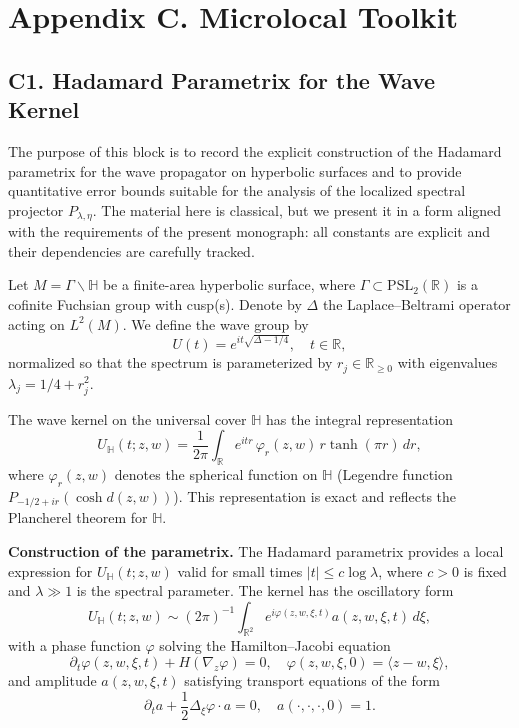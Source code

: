 \section*{Appendix C. Microlocal Toolkit}

\subsection*{C1. Hadamard Parametrix for the Wave Kernel}

The purpose of this block is to record the explicit construction of the Hadamard parametrix for the wave propagator on hyperbolic surfaces and to provide quantitative error bounds suitable for the analysis of the localized spectral projector $P_{\lambda,\eta}$. The material here is classical, but we present it in a form aligned with the requirements of the present monograph: all constants are explicit and their dependencies are carefully tracked.

\medskip

Let $M = \Gamma \backslash \mathbb{H}$ be a finite-area hyperbolic surface, where $\Gamma \subset \mathrm{PSL}_2(\mathbb{R})$ is a cofinite Fuchsian group with cusp(s). Denote by $\Delta$ the Laplace–Beltrami operator acting on $L^2(M)$. We define the wave group by
\[
U(t) = e^{it\sqrt{\Delta - 1/4}}, \quad t \in \mathbb{R},
\]
normalized so that the spectrum is parameterized by $r_j \in \mathbb{R}_{\ge 0}$ with eigenvalues $\lambda_j = 1/4 + r_j^2$.

The wave kernel on the universal cover $\mathbb{H}$ has the integral representation
\[
U_{\mathbb{H}}(t; z, w) = \frac{1}{2\pi} \int_{\mathbb{R}} e^{i t r} \, \varphi_r(z, w) \, r \tanh(\pi r)\, dr,
\]
where $\varphi_r(z, w)$ denotes the spherical function on $\mathbb{H}$ (Legendre function $P_{-1/2+ir}(\cosh d(z,w))$). This representation is exact and reflects the Plancherel theorem for $\mathbb{H}$.

\medskip

\textbf{Construction of the parametrix.} The Hadamard parametrix provides a local expression for $U_{\mathbb{H}}(t; z,w)$ valid for small times $|t| \le c \log \lambda$, where $c > 0$ is fixed and $\lambda \gg 1$ is the spectral parameter. The kernel has the oscillatory form
\[
U_{\mathbb{H}}(t; z,w) \sim (2\pi)^{-1} \int_{\mathbb{R}^2} e^{i\varphi(z,w,\xi,t)} a(z,w,\xi,t)\, d\xi,
\]
with a phase function $\varphi$ solving the Hamilton–Jacobi equation
\[
\partial_t \varphi(z,w,\xi,t) + H(\nabla_z \varphi) = 0, \quad \varphi(z,w,\xi,0) = \langle z-w,\xi \rangle,
\]
and amplitude $a(z,w,\xi,t)$ satisfying transport equations of the form
\[
\partial_t a + \frac{1}{2}\Delta_\xi \varphi \cdot a = 0, \quad a(\cdot,\cdot,\cdot,0) = 1.
\]

